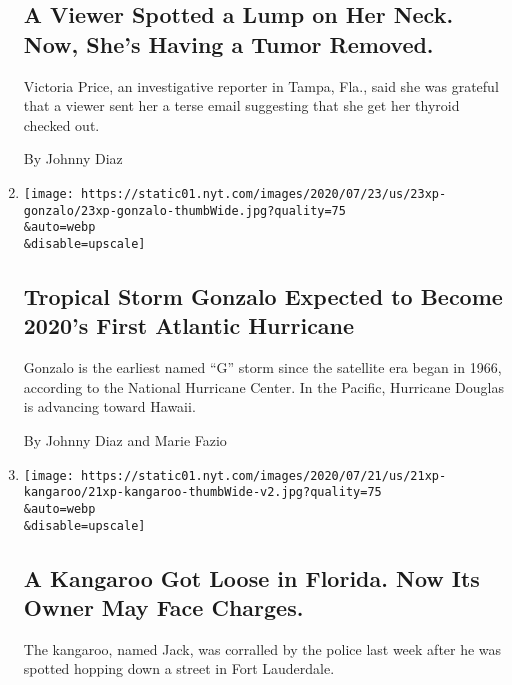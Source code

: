 \begin{enumerate}
{  \subsection{A Viewer Spotted a Lump on Her Neck. Now, She's Having a
  Tumor
  Removed.}\label{a-viewer-spotted-a-lump-on-her-neck-now-shes-having-a-tumor-removed}}

  Victoria Price, an investigative reporter in Tampa, Fla., said she was
  grateful that a viewer sent her a terse email suggesting that she get
  her thyroid checked out.

  By Johnny Diaz
\item
  \href{/2020/07/23/world/americas/tropical-storm-gonzalo-hurricane.html}{}

  \texttt{[image: https://static01.nyt.com/images/2020/07/23/us/23xp-gonzalo/23xp-gonzalo-thumbWide.jpg?quality=75\\\&auto=webp\\\&disable=upscale]}

  \hypertarget{tropical-storm-gonzalo-expected-to-become-2020s-first-atlantic-hurricane}{%
  \subsection{Tropical Storm Gonzalo Expected to Become 2020's First
  Atlantic
  Hurricane}\label{tropical-storm-gonzalo-expected-to-become-2020s-first-atlantic-hurricane}}

  Gonzalo is the earliest named ``G'' storm since the satellite era
  began in 1966, according to the National Hurricane Center. In the
  Pacific, Hurricane Douglas is advancing toward Hawaii.

  By Johnny Diaz and Marie Fazio
\item
  \href{/2020/07/21/us/kangaroo-fort-lauderdale.html}{}

  \texttt{[image: https://static01.nyt.com/images/2020/07/21/us/21xp-kangaroo/21xp-kangaroo-thumbWide-v2.jpg?quality=75\\\&auto=webp\\\&disable=upscale]}

  \hypertarget{a-kangaroo-got-loose-in-florida-now-its-owner-may-face-charges}{%
  \subsection{A Kangaroo Got Loose in Florida. Now Its Owner May Face
  Charges.}\label{a-kangaroo-got-loose-in-florida-now-its-owner-may-face-charges}}

  The kangaroo, named Jack, was corralled by the police last week after
  he was spotted hopping down a street in Fort Lauderdale.


\end{enumerate}

